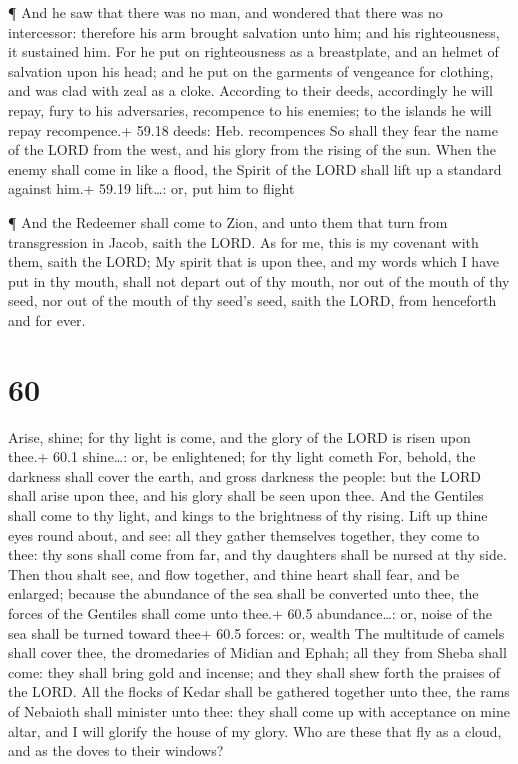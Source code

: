  ¶ And he saw that there was no man, and wondered that
there was no intercessor: therefore his arm brought salvation unto him;
and his righteousness, it sustained him.  For he put on
righteousness as a breastplate, and an helmet of salvation upon his
head; and he put on the garments of vengeance for clothing, and was clad
with zeal as a cloke.  According to their deeds,
accordingly he will repay, fury to his adversaries, recompence to his
enemies; to the islands he will repay recompence.+ 59.18 deeds: Heb.
recompences  So shall they fear the name of the LORD from
the west, and his glory from the rising of the sun. When the enemy shall
come in like a flood, the Spirit of the LORD shall lift up a standard
against him.+ 59.19 lift\ldots: or, put him to flight

 ¶ And the Redeemer shall come to Zion, and unto them that
turn from transgression in Jacob, saith the LORD.  As for
me, this is my covenant with them, saith the LORD; My spirit that is
upon thee, and my words which I have put in thy mouth, shall not depart
out of thy mouth, nor out of the mouth of thy seed, nor out of the mouth
of thy seed's seed, saith the LORD, from henceforth and for ever.

\hypertarget{section-59}{%
\section{60}\label{section-59}}

 Arise, shine; for thy light is come, and the glory of the
LORD is risen upon thee.+ 60.1 shine\ldots: or, be enlightened; for thy
light cometh  For, behold, the darkness shall cover the
earth, and gross darkness the people: but the LORD shall arise upon
thee, and his glory shall be seen upon thee.  And the
Gentiles shall come to thy light, and kings to the brightness of thy
rising.  Lift up thine eyes round about, and see: all they
gather themselves together, they come to thee: thy sons shall come from
far, and thy daughters shall be nursed at thy side.  Then
thou shalt see, and flow together, and thine heart shall fear, and be
enlarged; because the abundance of the sea shall be converted unto thee,
the forces of the Gentiles shall come unto thee.+ 60.5 abundance\ldots:
or, noise of the sea shall be turned toward thee+ 60.5 forces: or,
wealth  The multitude of camels shall cover thee, the
dromedaries of Midian and Ephah; all they from Sheba shall come: they
shall bring gold and incense; and they shall shew forth the praises of
the LORD.  All the flocks of Kedar shall be gathered
together unto thee, the rams of Nebaioth shall minister unto thee: they
shall come up with acceptance on mine altar, and I will glorify the
house of my glory.  Who are these that fly as a cloud, and
as the doves to their windows?

